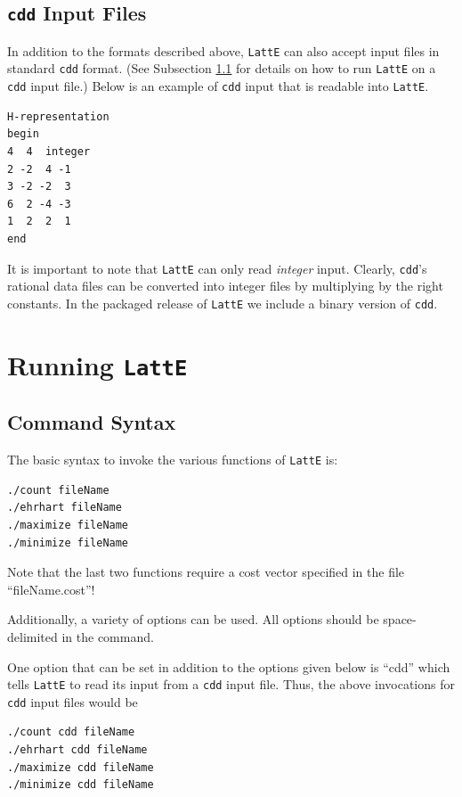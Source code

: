\documentclass{article}
\begin{document}
\subsection{{\tt cdd} Input Files}
In addition to the formats described above, {\tt LattE} can also
accept input files in standard {\tt cdd} format. (See Subsection 
\ref{Command Syntax} for
details on how to run {\tt LattE} on a {\tt cdd} input file.) Below is
an example of {\tt cdd} input that is readable into {\tt LattE}.
\begin{verbatim}
H-representation
begin
4  4  integer
2 -2  4 -1
3 -2 -2  3
6  2 -4 -3
1  2  2  1
end
\end{verbatim}
It is important to note that {\tt LattE} can only read 
{\em integer} input.  Clearly, {\tt cdd}'s rational data files can be
converted into integer files by multiplying by the right constants. In
the packaged release of {\tt LattE} we include a binary version of
{\tt cdd}. 


\newpage

\section{Running {\tt LattE}}\label{Running LattE}
 	
\subsection{Command Syntax}\label{Command Syntax}
The basic syntax to invoke the various functions of {\tt LattE} is:
\begin{verbatim}
./count fileName
./ehrhart fileName
./maximize fileName
./minimize fileName
\end{verbatim}
Note that the last two functions require a cost vector specified in
the file ``fileName.cost''!

Additionally, a variety of options can be used. All options should be
space-delimited in the command. 

One option that can be set in addition to the options given below is
``cdd'' which tells {\tt LattE} to read its input from a {\tt cdd}
input file. Thus, the above invocations for {\tt cdd} input files would be
\begin{verbatim}
./count cdd fileName
./ehrhart cdd fileName
./maximize cdd fileName
./minimize cdd fileName
\end{verbatim}
\end{document}
